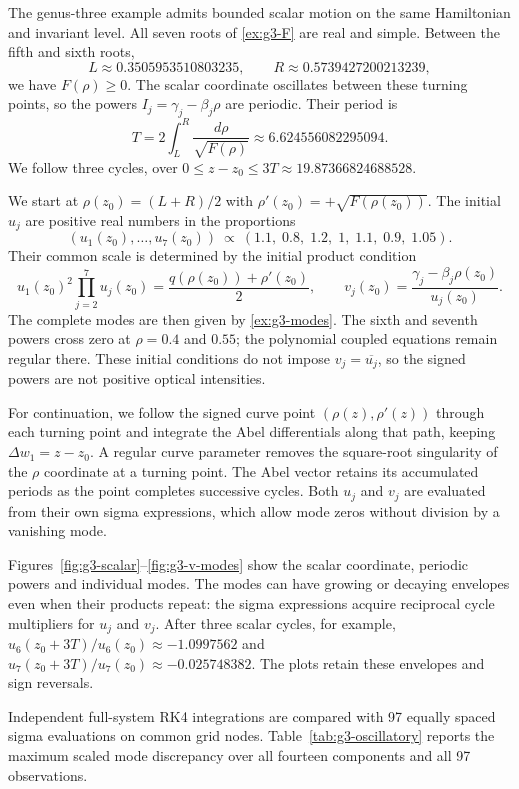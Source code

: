 \documentclass[11pt]{article}
\begin{document}
The genus-three example admits bounded scalar motion on the same Hamiltonian and invariant level. All seven roots of \eqref{ex:g3-F} are real and simple. Between the fifth and sixth roots,
\[
L\approx0.3505953510803235,\qquad R\approx0.5739427200213239,
\]
we have $F(\rho)\ge0$. The scalar coordinate oscillates between these turning points, so the powers $I_j=\gamma_j-\beta_j\rho$ are periodic. Their period is
\[
T=2\int_L^R\frac{d\rho}{\sqrt{F(\rho)}}\approx6.624556082295094.
\]
We follow three cycles, over $0\le z-z_0\le3T\approx19.87366824688528$.

We start at $\rho(z_0)=(L+R)/2$ with $\rho'(z_0)=+\sqrt{F(\rho(z_0))}$. The initial $u_j$ are positive real numbers in the proportions
\[
(u_1(z_0),\ldots,u_7(z_0))\ \propto\ (1.1,\;0.8,\;1.2,\;1,\;1.1,\;0.9,\;1.05).
\]
Their common scale is determined by the initial product condition
\[
u_1(z_0)^2\prod_{j=2}^7u_j(z_0)
 =\frac{q(\rho(z_0))+\rho'(z_0)}2,\qquad
v_j(z_0)=\frac{\gamma_j-\beta_j\rho(z_0)}{u_j(z_0)}.
\]
The complete modes are then given by \eqref{ex:g3-modes}. The sixth and seventh powers cross zero at $\rho=0.4$ and $0.55$; the polynomial coupled equations remain regular there. These initial conditions do not impose $v_j=\overline{u_j}$, so the signed powers are not positive optical intensities.

For continuation, we follow the signed curve point $(\rho(z),\rho'(z))$ through each turning point and integrate the Abel differentials along that path, keeping $\Delta w_1=z-z_0$. A regular curve parameter removes the square-root singularity of the $\rho$ coordinate at a turning point. The Abel vector retains its accumulated periods as the point completes successive cycles. Both $u_j$ and $v_j$ are evaluated from their own sigma expressions, which allow mode zeros without division by a vanishing mode.

Figures~\ref{fig:g3-scalar}--\ref{fig:g3-v-modes} show the scalar coordinate, periodic powers and individual modes. The modes can have growing or decaying envelopes even when their products repeat: the sigma expressions acquire reciprocal cycle multipliers for $u_j$ and $v_j$. After three scalar cycles, for example, $u_6(z_0+3T)/u_6(z_0)\approx-1.0997562$ and $u_7(z_0+3T)/u_7(z_0)\approx-0.025748382$. The plots retain these envelopes and sign reversals.

Independent full-system RK4 integrations are compared with 97 equally spaced sigma evaluations on common grid nodes. Table~\ref{tab:g3-oscillatory} reports the maximum scaled mode discrepancy over all fourteen components and all 97 observations.
\end{document}
